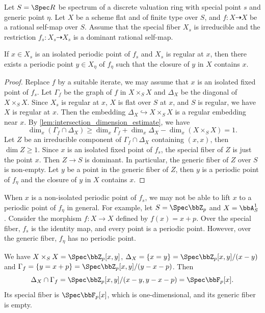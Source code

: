   \begin{lemma}\label{lem:lifting_isolated_periodic_points}
    Let $S = \Spec R$ be spectrum of a discrete valuation ring with special point $s$ and generic point $\eta$. 
    Let $X$ be a scheme flat and of finite type over $S$, and $f: X \dashrightarrow X$ be a rational self-map over $S$.
    Assume that the special fiber $X_s$ is irreducible and the restriction $f_s: X_s \dashrightarrow X_s$ is a dominant rational self-map. 
    
    If $x\in X_s$ is an isolated periodic point of $f_s$ and $X_s$ is regular at $x$, then there exists a periodic point $y\in X_\eta$ of $f_\eta$ such that the closure of $y$ in $X$ contains $x$.
  \end{lemma}
  \begin{proof}
    Replace $f$ by a suitable iterate, we may assume that $x$ is an isolated fixed point of $f_s$.
    Let $\Gamma_f$ be the graph of $f$ in $X \times_S X$ and $\Delta_X$ be the diagonal of $X \times_S X$.
    Since $X_s$ is regular at $x$, $X$ is flat over $S$ at $x$, and $S$ is regular, we have $X$ is regular at $x$.
    Then the embedding $\Delta_X \hookrightarrow X \times_S X$ is a regular embedding near $x$.
    By \cref{lem:intersection_dimension_estimate}, we have 
    \[ \dim_x (\Gamma_f \cap \Delta_X) \geq \dim_x \Gamma_f + \dim_x \Delta_X - \dim_x (X \times_S X) = 1. \]
    Let $Z$ be an irreducible component of $\Gamma_f \cap \Delta_X$ containing $(x,x)$, then $\dim Z \geq 1$.
    Since $x$ is an isolated fixed point of $f_s$, the special fiber of $Z$ is just the point $x$.
    Then $Z \to S$ is dominant.
    In particular, the generic fiber of $Z$ over $S$ is non-empty.
    Let $y$ be a point in the generic fiber of $Z$, then $y$ is a periodic point of $f_\eta$ and the closure of $y$ in $X$ contains $x$.
  \end{proof}

  \begin{example}
    When $x$ is a non-isolated periodic point of $f_s$, we may not be able to lift $x$ to a periodic point of $f_\eta$ in general.
    For example, let $S = \Spec \bbZ_p$ and $X = \bbA^1_S$.
    Consider the morphism $f: X \to X$ defined by $f(x) = x + p$.
    Over the special fiber, $f_s$ is the identity map, and every point is a periodic point.
    However, over the generic fiber, $f_\eta$ has no periodic point.

    We have $X \times_S X = \Spec \bbZ_p[x,y]$, $\Delta_X = \{x=y\} = \Spec \bbZ_p[x,y]/(x-y)$ and $\Gamma_f = \{y = x + p\} = \Spec \bbZ_p[x,y]/(y-x-p)$.
    Then 
    \[ \Delta_X \cap \Gamma_f = \Spec \bbZ_p[x,y]/(x-y, y-x-p) = \Spec \bbF_p[x].\]
    Its special fiber is $\Spec \bbF_p[x]$, which is one-dimensional, and its generic fiber is empty.
  \end{example}


